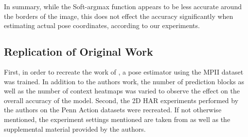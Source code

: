 \begin{table}[]
    \centering
    \caption{Mean average accuracy (in percent) of Soft-argmax when detecting ground truth coordinates from synthetic joint heatmaps. Threshold referrs to the amound of pixels the estimate is allowed to deviate from the ground truth annotation. $c$ referres to the covariance used for creating the synthetic heatmaps. The large discrepancy between a threshold of $1$ and a threshold of $2$ is most likely due to rounding errors.}
    \label{tab:softargmax_numeric_eval}
\end{table}

In summary, while the Soft-argmax function appears to be less accurate around the borders of the image, this does not effect the accuracy significantly when estimating actual pose coordinates, according to our experiments.

\subsection{Replication of Original Work}
\label{sec:exp-replication}

First, in order to recreate the work of \cite{luvizon_2d/3d_2018}, a pose estimator using the MPII dataset was trained.
In addition to the authors work, the number of prediction blocks as well as the number of context heatmaps was varied to observe the effect on the overall accuracy of the model.
Second, the 2D HAR experiments performed by the authors on the Penn Action datasets were recreated.
If not otherwise mentioned, the experiment settings mentioned are taken from \cite{luvizon_2d/3d_2018} as well as the supplemental material provided by the authors.

